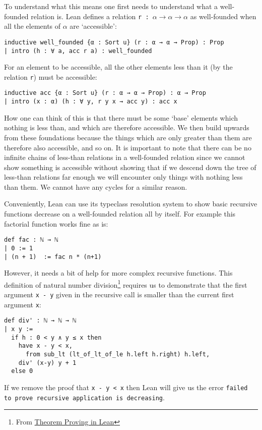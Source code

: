 \documentclass{article}
\renewcommand{\a}{\alpha}
\newcommand{\ct}{\texttt}
\begin{document}
To understand what this means one first needs to understand what a well-founded relation is. Lean defines a relation \ct{r : $\a \to \a \to \a$} as well-founded when all the elements of $\a$ are `accessible':
\begin{lstlisting}
inductive well_founded {α : Sort u} (r : α → α → Prop) : Prop
| intro (h : ∀ a, acc r a) : well_founded
\end{lstlisting}
For an element to be accessible, all the other elements less than it (by the relation \ct{r}) must be accessible:
\begin{lstlisting}
inductive acc {α : Sort u} (r : α → α → Prop) : α → Prop
| intro (x : α) (h : ∀ y, r y x → acc y) : acc x
\end{lstlisting}

How one can think of this is that there must be some `base' elements which nothing is less than, and which are therefore accessible.
We then build upwards from these foundations because the things which are only greater than them are therefore also accessible, and so on.
It is important to note that there can be no infinite chains of less-than relations in a well-founded relation since we cannot show something is accessible without showing that if we descend down the tree of less-than relations far enough we will encounter only things with nothing less than them. %
We cannot have any cycles for a similar reason.

Conveniently, Lean can use its typeclass resolution system to show basic recursive functions decrease on a well-founded relation all by itself. For example this factorial function works fine as is:
\begin{lstlisting}
def fac : ℕ → ℕ
| 0 := 1
| (n + 1)  := fac n * (n+1)
\end{lstlisting}
However, it needs a bit of help for more complex recursive functions.
This definition of natural number division\footnote{From \href{https://leanprover.github.io/theorem\_proving\_in\_lean/induction\_and\_recursion.html\#well-founded-recursion-and-induction}{Theorem Proving in Lean}} requires us to demonstrate that the first argument \ct{x - y} given in the recursive call is smaller than the current first argument \ct{x}:
\begin{lstlisting}
def div' : ℕ → ℕ → ℕ
| x y :=
  if h : 0 < y ∧ y ≤ x then
    have x - y < x,
      from sub_lt (lt_of_lt_of_le h.left h.right) h.left,
    div' (x-y) y + 1
  else 0
\end{lstlisting}
If we remove the proof that \ct{x - y < x} then Lean will give us the error \ct{failed to prove recursive application is decreasing}.
\end{document}
